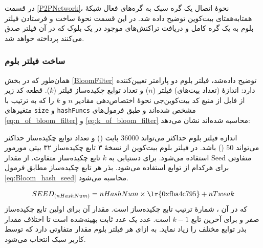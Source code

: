در قسمت \ref{P2PNetwork}، نحوهٔ اتصال یک گره سبک به گره‌های فعال شبکه‌ٔ همتا‌به‌همتای بیت‌کوین توضیح داده شد. در این قسمت نحوهٔ ساخت و فرستادن فیلتر بلوم به یک گره کامل و دریافت تراکنش‌های موجود در یک بلوک که در آن فیلتر صدق می‌کنند پرداخته خواهد شد.

\subsubsection{ساخت فیلتر بلوم}
همان‌طور که در بخش \ref{BloomFilter} توضیح داده‌شد، فیلتر بلوم دو پارامتر تعیین‌کننده دارد: اندازهٔ (تعداد بیت‌های) فیلتر ($n$) و تعداد توابع چکیده‌ساز فیلتر ($k$). قطعه کد زیر از فایل  از منبع کد بیت‌کوین‌جی \cite{bitcoinj_BloomFilter} نحوه‌ٔ اختصاص‌دهی مقادیر $n$ و $k$ را که به ترتیب با متغیر‌های \texttt{size} و \texttt{hashFuncs} مشخص شده‌اند و طبق فرمول‌های \eqref{eq:n_of_bloom_filter} و \eqref{eq:k_of_bloom_filter} محاسبه شده‌اند نشان می‌دهد:


اندازه فیلتر بلوم حداکثر می‌تواند $36000$ بایت () و تعداد توابع چکیده‌ساز حداکثر می‌تواند $50$ () باشد. در فیلتر بلوم بیت‌کوین از نسخهٔ ۳ تابع چکیده‌ساز ۳۲ بیتی 
مورمور 
استفاده می‌شود\cite{Hearn2013}. برای دستیابی به $k$ تابع چکیده‌ساز متفاوت، از مقدار 
\gls{Seed}
متفاوتی برای هرکدام از توابع استفاده می‌شود. بذر هر تابع چکیده‌ساز مطابق فرمول \eqref{eq:Bloom_hash_seed} محاسبه می‌شود.

\begin{equation}
\label{eq:Bloom_hash_seed}
SEED_{(nHashNum)} = nHashNum \times \text{\lr{0xfba4c795}} + nTweak
\end{equation}
که در آن ، شمارهٔ ترتیب تابع چکیده‌ساز است. مقدار آن برای اولین تابع چکیده‌ساز صفر و برای آخرین تابع $k-1$ است. عدد  یک عدد ثابت بهینه‌شده است تا اختلاف مقدار بذر توابع مختلف را زیاد نماید.  به ازای هر فیلتر بلوم مقدار متفاوتی دارد که توسط کاربر سبک انتخاب می‌شود. 

